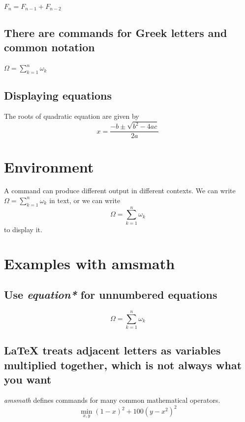 \documentclass[12pt]{article}
\begin{document}
$F_n = F_{n-1} + F_{n-2}$

\subsection{There are commands for Greek letters and common notation}

$\Omega = \sum_{k=1}^{n} \omega_k$

\subsection{Displaying equations}

The roots of quadratic equation are given by
\begin{equation}
    x = \frac{-b \pm \sqrt{b^2 - 4ac}}{2a}
\end{equation}

\section{Environment}

A command can produce different output in different contexts. We can write $\Omega = \sum_{k=1}^{n} \omega_k$ in text, or we can write
\begin{equation}
    \Omega = \sum_{k=1}^{n} \omega_k
\end{equation}
to display it.

\section{Examples with amsmath}

\subsection{Use \emph{equation*} for unnumbered equations}

\begin{equation*}
    \Omega = \sum_{k=1}^{n} \omega_k
\end{equation*}

\subsection{LaTeX treats adjacent letters as variables multiplied together, which is not always what you want}

\emph{amsmath} defines commands for many common mathematical operators.
\begin{equation*} 
    \min_{x,y}{(1-x)^2 + 100(y-x^2)^2}
\end{equation*}
\end{document}
